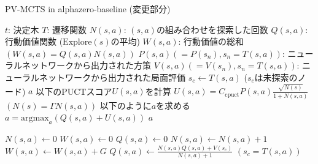 \begin{algorithm}
    \caption{PV-MCTS in alphazero-baseline (変更部分)}
    \label{alg:base}
    \begin{algorithmic}[1]
    \small
        \State $t$: 決定木
        \State $T$: 遷移関数
        \State $N(s, a)$: $(s, a)$の組み合わせを探索した回数
        \State $Q(s, a)$: 行動価値関数 ($\textrm{Explore}(s)$の平均)
        \State $W(s, a)$: 行動価値の総和$(W(s, a)=Q(s, a)N(s, a))$
        \State $P(s, a)(=P(s_n), s_n=T(s, a))$: 
        \State ニューラルネットワークから出力された方策
        \State $V(s, a)(=V(s_n), s_n=T(s, a))$: 
        \State ニューラルネットワークから出力された局面評価
                \State $s_c \gets T(s, a)$ ($s_c$は未探索のノード)
                \State {}
                \State \Return $a$
            \Else
                \State 以下のPUCTスコア$U(s, a)$を計算
                \State \underline{$U(s, a)= C_{\textrm{cpuct}}P(s, a)\frac{\sqrt{N(s)}}{1+N(s, a)}$}
                \State $(N(s)=\Gamma N(s, a))$
                \State 以下のように$a$を求める
                \State $a = {\textrm{argmax}}_a (Q(s, a)+U(s, a))$
                \State \Return $a$
                
            \EndIf
        \EndFunction
                \State $N(s, a) \gets 0$
                \State $W(s, a) \gets 0$
                \State $Q(s, a) \gets 0$
            \EndFor
        \EndFunction
                \State $N(s, a) \gets N(s, a)+1$
                \State $W(s, a) \gets W(s, a)+G$
                \State \underline{$Q(s, a) \gets \frac{N(s, a)Q(s, a)+V(s_c)}{N(s, a)+1}$}
				\State $(s_c = T(s, a))$
            \EndFor
        \EndFunction
    \end{algorithmic}
\end{algorithm}